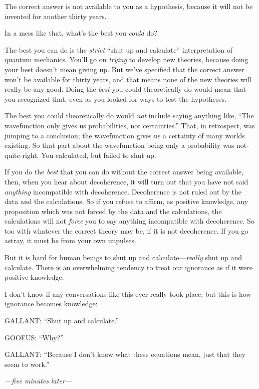 {
 The correct answer is not available to you as a hypothesis,
because it will not be invented for another thirty years.}

{
 In a mess like that, what's the best you
\textit{could} do?}

{
 The best you can do is the \textit{strict} ``shut
up and calculate'' interpretation of quantum
mechanics. You'll go on \textit{trying} to develop new
theories, because doing your best doesn't mean giving
up. But we've specified that the correct answer
won't be available for thirty years, and that means
none of the new theories will really be any good. Doing the
\textit{best} you could theoretically do would mean that you recognized
that, even as you looked for ways to test the hypotheses.}

{
 The best you could theoretically do would \textit{not} include
saying anything like, ``The wavefunction only gives us
probabilities, not certainties.'' That, in
retrospect, was jumping to a conclusion; the wavefunction gives us a
certainty of many worlds existing. So that part about the wavefunction
being only a probability was not-quite-right. You calculated, but
failed to shut up.}

{
 If you do the \textit{best} that you can do without the correct
answer being available, then, when you hear about decoherence, it will
turn out that you have not said \textit{anything} incompatible with
decoherence. Decoherence is not ruled out by the data and the
calculations. So if you refuse to affirm, as positive knowledge, any
proposition which was not forced by the data and the calculations, the
calculations will not \textit{force} you to say anything incompatible
with decoherence. So too with whatever the correct theory may be, if it
is not decoherence. If you go astray, it must be from your own
impulses.}

{
 But it is hard for human beings to shut up and
calculate---\textit{really} shut up and calculate. There is an
overwhelming tendency to treat our ignorance as if it were positive
knowledge.}

{
 I don't know if any conversations like this ever
really took place, but this is how ignorance becomes knowledge:}

{
 GALLANT: ``Shut up and
calculate.''}

{
 GOOFUS: ``Why?''}

{
 GALLANT: ``Because I don't know
what these equations mean, just that they seem to
work.''}

{
 \textit{{}---five minutes later---}}

